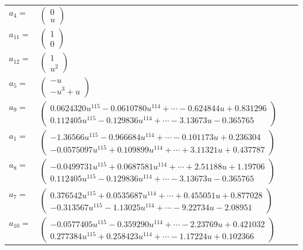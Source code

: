 \documentclass[1p]{elsarticle_modified}
\theoremstyle{definition}
\begin{document}
\begin{tabular}{m{7pt} m{180pt} m{7pt} m{180pt} }
\flushright $a_{4}=$&$\begin{pmatrix}0\\u\end{pmatrix}$ \\
\flushright $a_{11}=$&$\begin{pmatrix}1\\0\end{pmatrix}$ \\
\flushright $a_{12}=$&$\begin{pmatrix}1\\u^2\end{pmatrix}$ \\
\flushright $a_{5}=$&$\begin{pmatrix}- u\\- u^3+u\end{pmatrix}$ \\
\flushright $a_{9}=$&$\begin{pmatrix}0.0624320 u^{115}-0.0610780 u^{114}+\cdots-0.624844 u+0.831296\\0.112405 u^{115}-0.129836 u^{114}+\cdots-3.13673 u-0.365765\end{pmatrix}$ \\
\flushright $a_{1}=$&$\begin{pmatrix}-1.36566 u^{115}-0.966684 u^{114}+\cdots-0.101173 u+0.236304\\-0.0575097 u^{115}+0.109899 u^{114}+\cdots+3.11321 u+0.437787\end{pmatrix}$ \\
\flushright $a_{8}=$&$\begin{pmatrix}-0.0499731 u^{115}+0.0687581 u^{114}+\cdots+2.51188 u+1.19706\\0.112405 u^{115}-0.129836 u^{114}+\cdots-3.13673 u-0.365765\end{pmatrix}$ \\
\flushright $a_{7}=$&$\begin{pmatrix}0.376542 u^{115}+0.0535687 u^{114}+\cdots+0.455051 u+0.877028\\-0.313567 u^{115}-1.13025 u^{114}+\cdots-9.22734 u-2.08951\end{pmatrix}$ \\
\flushright $a_{10}=$&$\begin{pmatrix}-0.0577405 u^{115}-0.359290 u^{114}+\cdots-2.23769 u+0.421032\\0.277384 u^{115}+0.258423 u^{114}+\cdots-1.17224 u+0.102366\end{pmatrix}$ \\

\end{tabular}
\end{document}
